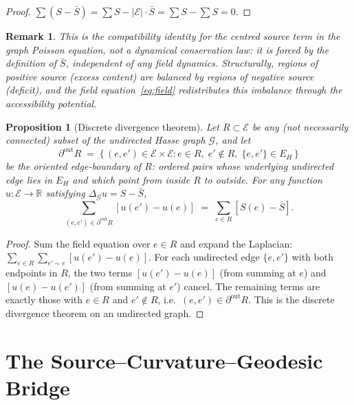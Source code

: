 \documentclass[12pt]{article}
\newtheorem{proposition}[theorem]{Proposition}
\newtheorem{remark}[theorem]{Remark}
\newcommand{\Ecal}{\mathcal{E}}
\newcommand{\Gcal}{\mathcal{G}}
\begin{document}
\begin{proof}
$\sum(S - \bar{S}) = \sum S - |\Ecal| \cdot \bar{S} = \sum S - \sum S = 0$.
\end{proof}

\begin{remark}
This is the compatibility identity for the centred source term in the graph Poisson equation, not a dynamical conservation law: it is forced by the definition of $\bar S$, independent of any field dynamics. Structurally, regions of positive source (excess content) are balanced by regions of negative source (deficit), and the field equation~\eqref{eq:field} redistributes this imbalance through the accessibility potential.
\end{remark}

\begin{proposition}[Discrete divergence theorem]\label{prop:flow}
Let $R \subset \Ecal$ be any (not necessarily connected) subset of the undirected Hasse graph $\Gcal$, and let
\[
    \partial^{\mathrm{out}} R \;=\; \{\,(e, e') \in \Ecal \times \Ecal : e \in R,\; e' \notin R,\; \{e,e'\} \in E_H\,\}
\]
be the \textit{oriented edge-boundary} of $R$: ordered pairs whose underlying undirected edge lies in $E_H$ and which point from inside $R$ to outside. For any function $u: \Ecal \to \mathbb{R}$ satisfying $\Delta_\Gcal u = S - \bar{S}$,
\begin{equation}
    \sum_{(e,e') \in \partial^{\mathrm{out}} R} [u(e') - u(e)] \;=\; \sum_{e \in R} [S(e) - \bar{S}].
\end{equation}
\end{proposition}

\begin{proof}
Sum the field equation over $e \in R$ and expand the Laplacian: $\sum_{e \in R} \sum_{e' \sim e} [u(e') - u(e)]$. For each undirected edge $\{e, e'\}$ with both endpoints in $R$, the two terms $[u(e') - u(e)]$ (from summing at $e$) and $[u(e) - u(e')]$ (from summing at $e'$) cancel. The remaining terms are exactly those with $e \in R$ and $e' \notin R$, i.e.\ $(e, e') \in \partial^{\mathrm{out}} R$. This is the discrete divergence theorem on an undirected graph.
\end{proof}

\section{The Source--Curvature--Geodesic Bridge}\label{sec:bridge}
\end{document}

